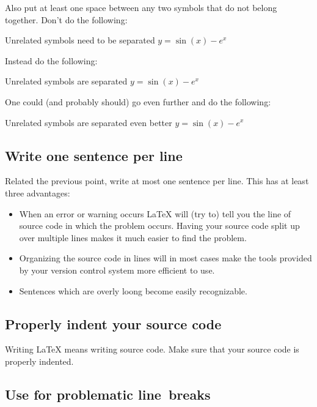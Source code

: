 Also put at least one space between any two symbols that do not belong together.
Don’t do the following:
\begin{showcode}{Unrelated symbols need to be separated}
$y=\sin(x)-e^x$
\end{showcode}
Instead do the following:
\begin{showcode}{Unrelated symbols are separated}
$y = \sin(x) - e^x$
\end{showcode}
One could (and probably should) go even further and do the following:
\begin{showcode}{Unrelated symbols are separated even better}
$y = \sin ( x ) - e^x$
\end{showcode}



\subsection{Write one sentence per line}

Related the previous point, write at most one sentence per line.
This has at least three advantages:
\begin{itemize}[wide=0pt, leftmargin=*]
  \item
    When an error or warning occurs {\LaTeX} will (try to) tell you the line of source code in which the problem occurs.
    Having your source code split up over multiple lines makes it much easier to find the problem.
  \item
    Organizing the source code in lines will in most cases make the tools provided by your version control system more efficient to use.
  \item
   Sentences which are overly loong become easily recognizable.
\end{itemize}



\subsection{Properly indent your source code}

Writing {\LaTeX} means writing source code.
Make sure that your source code is properly indented.



\subsection{Use \inlinecodetitle{\%} for problematic line~breaks}

